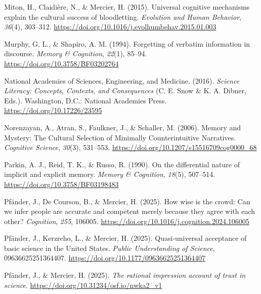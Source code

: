 \documentclass[
  english,
  doc,floatsintext]{apa6}
\newlength{\cslhangindent}
\newenvironment{CSLReferences}[2] %
 {\begin{list}{}{%
  \setlength{\itemindent}{0pt}
  \setlength{\leftmargin}{0pt}
  \setlength{\parsep}{0pt}
  \ifodd #1
   \setlength{\leftmargin}{\cslhangindent}
   \setlength{\itemindent}{-1\cslhangindent}
  \fi
  \setlength{\itemsep}{#2\baselineskip}}}
 {\end{list}}
\begin{document}
\begin{CSLReferences}{1}{0}
Miton, H., Claidière, N., \& Mercier, H. (2015). Universal cognitive mechanisms explain the cultural success of bloodletting. \emph{Evolution and Human Behavior}, \emph{36}(4), 303--312. \url{https://doi.org/10.1016/j.evolhumbehav.2015.01.003}

Murphy, G. L., \& Shapiro, A. M. (1994). Forgetting of verbatim information in discourse. \emph{Memory \& Cognition}, \emph{22}(1), 85--94. \url{https://doi.org/10.3758/BF03202764}

National Academies of Sciences, Engineering, and Medicine. (2016). \emph{Science Literacy: Concepts, Contexts, and Consequences} (C. E. Snow \& K. A. Dibner, Eds.). Washington, D.C.: National Academies Press. \url{https://doi.org/10.17226/23595}

Norenzayan, A., Atran, S., Faulkner, J., \& Schaller, M. (2006). Memory and Mystery: The Cultural Selection of Minimally Counterintuitive Narratives. \emph{Cognitive Science}, \emph{30}(3), 531--553. \url{https://doi.org/10.1207/s15516709cog0000_68}

Parkin, A. J., Reid, T. K., \& Russo, R. (1990). On the differential nature of implicit and explicit memory. \emph{Memory \& Cognition}, \emph{18}(5), 507--514. \url{https://doi.org/10.3758/BF03198483}

Pfänder, J., De Courson, B., \& Mercier, H. (2025). How wise is the crowd: Can we infer people are accurate and competent merely because they agree with each other? \emph{Cognition}, \emph{255}, 106005. \url{https://doi.org/10.1016/j.cognition.2024.106005}

Pfänder, J., Kerzreho, L., \& Mercier, H. (2025). Quasi-universal acceptance of basic science in the United States. \emph{Public Understanding of Science}, 09636625251364407. \url{https://doi.org/10.1177/09636625251364407}

Pfänder, J., \& Mercier, H. (2025). \emph{The rational impression account of trust in science}. \url{https://doi.org/10.31234/osf.io/nwka2_v1}


\end{CSLReferences}
\end{document}
